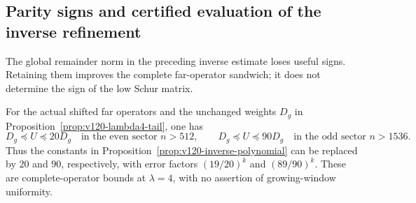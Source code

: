 \subsection*{Parity signs and certified evaluation of the inverse refinement}
The global remainder norm in the preceding inverse estimate loses useful
signs. Retaining them improves the complete far-operator sandwich;
it does not determine the sign of the low Schur matrix.

\begin{proposition}
\label{prop:v122-parity-inverse}
For the actual shifted far operators and the unchanged weights $D_g$
in Proposition~\ref{prop:v120-lambda4-tail}, one has
\[
 D_g\preceq U\preceq20D_g\quad\text{in the even sector }n>512,
 \qquad
 D_g\preceq U\preceq90D_g\quad\text{in the odd sector }n>1536.
\]
Thus the constants in Proposition~\ref{prop:v120-inverse-polynomial}
can be replaced by $20$ and $90$, respectively, with error factors
$(19/20)^k$ and $(89/90)^k$. These are complete-operator bounds
at $\lambda=4$, with no assertion of growing-window uniformity.
\end{proposition}
